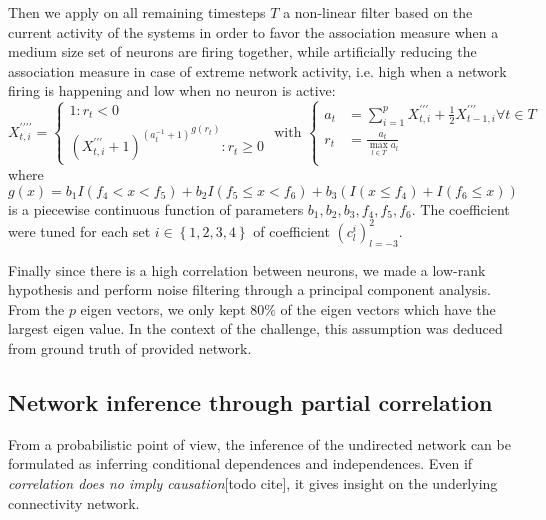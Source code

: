 \documentclass[wcp]{jmlr}
\begin{document}
Then we apply on all remaining timesteps $T$ a non-linear filter based on the current
activity of the systems in order to favor the association measure when
a medium size set of neurons are firing together, while artificially
reducing the association measure in case of extreme network activity,
i.e. high when a network firing is happening and low when no neuron is
active:
\begin{equation}
X^{\prime\prime\prime\prime}_{t,i} =
\left\{
  \begin{array}{l}
    1  : r_t < 0\\
    {(X^{\prime\prime\prime}_{t,i} + 1)^{(a_t^{-1} + 1)}}^{g(r_t)} : r_t \geq 0
  \end{array}
\right.
\text{ with }
\left\{
  \begin{array}{ll}
    a_t &= \sum_{i=1}^p X^{\prime\prime\prime}_{t,i} +
                       \frac{1}{2} X^{\prime\prime\prime}_{t-1,i} \forall t \in T\\
    r_t &= \frac{a_t}{\max_{l \in T}{a_l}} \\
  \end{array}
\right.
\end{equation}
where $g(x) = b_1 I(f_4 < x < f_5) + b_2  I(f_5 \leq x < f_6) +
b_3 (I(x\leq f_4) + I(f_ 6 \leq x))$ is a piecewise continuous function of
parameters $b_1, b_2, b_3, f_4, f_5, f_6$. The coefficient were tuned
for each set $i\in\left\{1, 2, 3, 4\right\}$ of coefficient
$\left(c_l^i\right)_{l=-3}^2$.

Finally since there is a high correlation between neurons, we made a
low-rank hypothesis and perform noise filtering through a principal component
analysis. From the $p$ eigen vectors, we only kept $80\%$ of
the eigen vectors which have the largest eigen value. In the context of the
challenge, this assumption was deduced from ground truth of provided network.

\subsection{Network inference through partial correlation}
\label{sec:inference}

From a probabilistic point of view, the inference of the undirected network
can be formulated as inferring conditional dependences and independences. Even
if \textit{correlation does no imply causation}[todo cite], it gives insight
on the underlying connectivity network.
\end{document}
